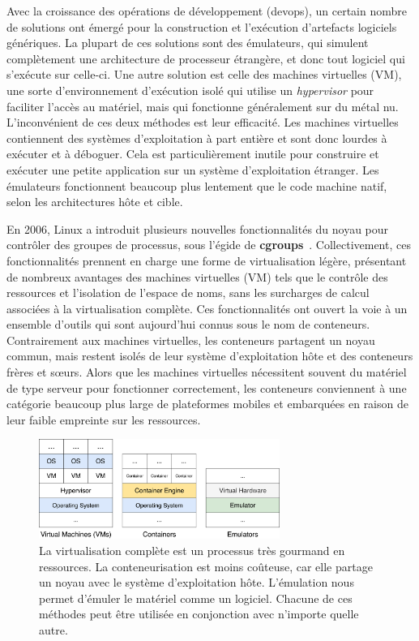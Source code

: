 Avec la croissance des opérations de développement (devops), un certain nombre de solutions ont émergé pour la construction et l'exécution d'artefacts logiciels génériques. La plupart de ces solutions sont des émulateurs, qui simulent complètement une architecture de processeur étrangère, et donc tout logiciel qui s'exécute sur celle-ci. Une autre solution est celle des machines virtuelles (VM), une sorte d'environnement d'exécution isolé qui utilise un \textit{hypervisor} pour faciliter l'accès au matériel, mais qui fonctionne généralement sur du métal nu. L'inconvénient de ces deux méthodes est leur efficacité. Les machines virtuelles contiennent des systèmes d'exploitation à part entière et sont donc lourdes à exécuter et à déboguer. Cela est particulièrement inutile pour construire et exécuter une petite application sur un système d'exploitation étranger. Les émulateurs fonctionnent beaucoup plus lentement que le code machine natif, selon les architectures hôte et cible.

En 2006, Linux a introduit plusieurs nouvelles fonctionnalités du noyau pour contrôler des groupes de processus, sous l'égide de \textbf{cgroups}~\citep{menage2007adding}. Collectivement, ces fonctionnalités prennent en charge une forme de virtualisation légère, présentant de nombreux avantages des machines virtuelles (VM) tels que le contrôle des ressources et l'isolation de l'espace de noms, sans les surcharges de calcul associées à la virtualisation complète. Ces fonctionnalités ont ouvert la voie à un ensemble d'outils qui sont aujourd'hui connus sous le nom de conteneurs. Contrairement aux machines virtuelles, les conteneurs partagent un noyau commun, mais restent isolés de leur système d'exploitation hôte et des conteneurs frères et sœurs. Alors que les machines virtuelles nécessitent souvent du matériel de type serveur pour fonctionner correctement, les conteneurs conviennent à une catégorie beaucoup plus large de plateformes mobiles et embarquées en raison de leur faible empreinte sur les ressources.

\begin{figure}
\center
\includegraphics[width=0.70\textwidth]{../figures/vms_containers_emulators.png}
\caption{La virtualisation complète est un processus très gourmand en ressources. La conteneurisation est moins coûteuse, car elle partage un noyau avec le système d'exploitation hôte. L'émulation nous permet d'émuler le matériel comme un logiciel. Chacune de ces méthodes peut être utilisée en conjonction avec n'importe quelle autre.\vspace{-10pt}}
\label{fig:vms_containers_emulators}
\end{figure}

